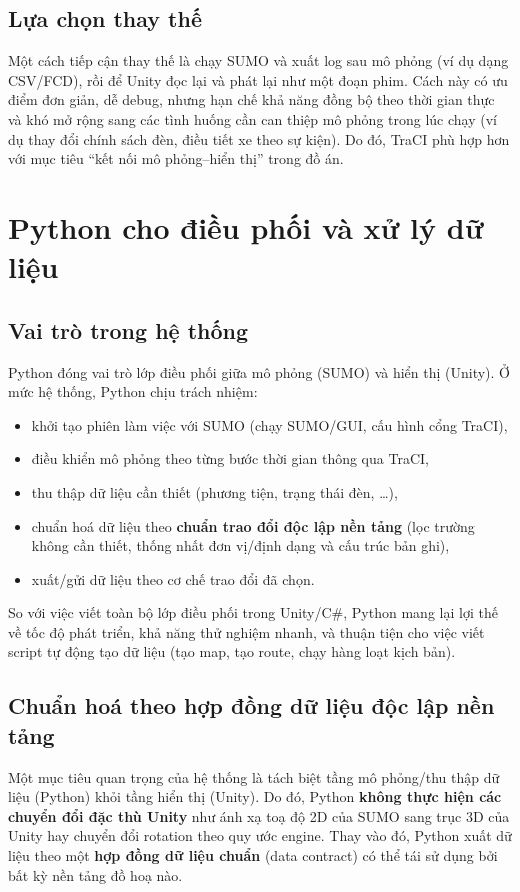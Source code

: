 \documentclass[../DoAn.tex]{subfiles}
\begin{document}
\subsection{Lựa chọn thay thế}
Một cách tiếp cận thay thế là chạy SUMO và xuất log sau mô phỏng (ví dụ dạng CSV/FCD), rồi để Unity đọc lại và phát lại như một đoạn phim. Cách này có ưu điểm đơn giản, dễ debug, nhưng hạn chế khả năng đồng bộ theo thời gian thực và khó mở rộng sang các tình huống cần can thiệp mô phỏng trong lúc chạy (ví dụ thay đổi chính sách đèn, điều tiết xe theo sự kiện). Do đó, TraCI phù hợp hơn với mục tiêu ``kết nối mô phỏng--hiển thị'' trong đồ án.

\section{Python cho điều phối và xử lý dữ liệu}
\subsection{Vai trò trong hệ thống}
Python đóng vai trò lớp điều phối giữa mô phỏng (SUMO) và hiển thị (Unity). Ở mức hệ thống, Python chịu trách nhiệm:
\begin{itemize}[leftmargin=2em]
	\item khởi tạo phiên làm việc với SUMO (chạy SUMO/GUI, cấu hình cổng TraCI),
	\item điều khiển mô phỏng theo từng bước thời gian thông qua TraCI,
	\item thu thập dữ liệu cần thiết (phương tiện, trạng thái đèn, \ldots),
	\item chuẩn hoá dữ liệu theo \textbf{chuẩn trao đổi độc lập nền tảng} (lọc trường không cần thiết, thống nhất đơn vị/định dạng và cấu trúc bản ghi),
	\item xuất/gửi dữ liệu theo cơ chế trao đổi đã chọn.
\end{itemize}

So với việc viết toàn bộ lớp điều phối trong Unity/C\#, Python mang lại lợi thế về tốc độ phát triển, khả năng thử nghiệm nhanh, và thuận tiện cho việc viết script tự động tạo dữ liệu (tạo map, tạo route, chạy hàng loạt kịch bản).

\subsection{Chuẩn hoá theo hợp đồng dữ liệu độc lập nền tảng}
Một mục tiêu quan trọng của hệ thống là tách biệt tầng mô phỏng/thu thập dữ liệu (Python) khỏi tầng hiển thị (Unity). Do đó, Python \textbf{không thực hiện các chuyển đổi đặc thù Unity} như ánh xạ toạ độ 2D của SUMO sang trục 3D của Unity hay chuyển đổi rotation theo quy ước engine. Thay vào đó, Python xuất dữ liệu theo một \textbf{hợp đồng dữ liệu chuẩn} (data contract) có thể tái sử dụng bởi bất kỳ nền tảng đồ hoạ nào.
\end{document}
